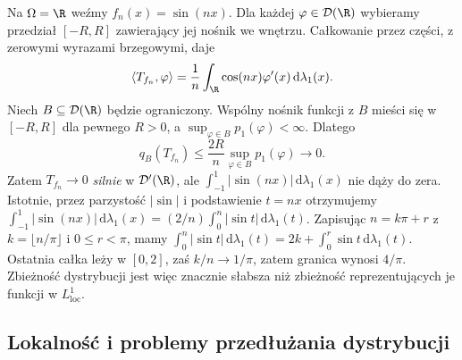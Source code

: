 \begin{przyklad}
\label{ex:oscillations19}
Na $\Omega=\R$ weźmy $f_n(x)=\sin(nx)$.
Dla każdej $\varphi\in\mathcal D(\R)$ wybieramy przedział
$[-R,R]$ zawierający jej nośnik we wnętrzu.
Całkowanie przez części, z zerowymi wyrazami brzegowymi,
daje
\[\langle T_{f_n},\varphi\rangle=
\frac1n\int_\R\cos(nx)\varphi'(x)\,
\mathrm d\lambda_1(x).\]
Niech $B\subseteq\mathcal D(\R)$ będzie ograniczony.
Wspólny nośnik funkcji z $B$ mieści się w $[-R,R]$
dla pewnego $R>0$, a $\sup_{\varphi\in B}p_1(\varphi)<\infty$.
Dlatego
\[q_B(T_{f_n})\le\frac{2R}{n}
\sup_{\varphi\in B}p_1(\varphi)\longrightarrow0.\]
Zatem $T_{f_n}\to0$ \emph{silnie} w $\mathcal D'(\R)$,
ale $\int_{-1}^1|\sin(nx)|\,\mathrm d\lambda_1(x)$
nie dąży do zera. Istotnie, przez parzystość $|\sin|$
i podstawienie $t=nx$ otrzymujemy
$\int_{-1}^1|\sin(nx)|\,\mathrm d\lambda_1(x)
=(2/n)\int_0^n|\sin t|\,\mathrm d\lambda_1(t)$.
Zapisując $n=k\pi+r$ z $k=\lfloor n/\pi\rfloor$ i $0\le r<\pi$,
mamy $\int_0^n|\sin t|\,\mathrm d\lambda_1(t)=2k+\int_0^r\sin t\,\mathrm d\lambda_1(t)$.
Ostatnia całka leży w $[0,2]$, zaś $k/n\to1/\pi$,
zatem granica wynosi $4/\pi$.
Zbieżność dystrybucji jest więc znacznie słabsza niż
zbieżność reprezentujących je funkcji w $L^1_{\mathrm{loc}}$.
\end{przyklad}

\subsection{Lokalność i problemy przedłużania dystrybucji}

